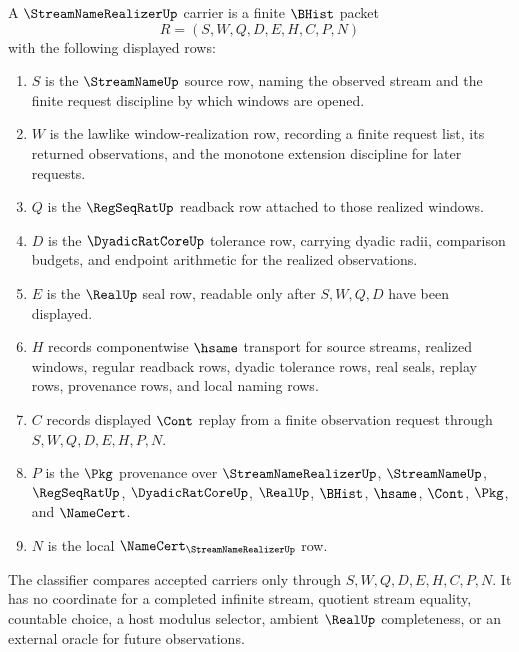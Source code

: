 \begin{definition}
\label{def:streamname-realizer-carrier}
A $\StreamNameRealizerUp$ carrier is a finite $\BHist$ packet
$$
R=(S,W,Q,D,E,H,C,P,N)
$$
with the following displayed rows:
\begin{enumerate}
\item $S$ is the $\StreamNameUp$ source row, naming the observed stream and the finite request discipline by which windows are opened.
\item $W$ is the lawlike window-realization row, recording a finite request list, its returned observations, and the monotone extension discipline for later requests.
\item $Q$ is the $\RegSeqRatUp$ readback row attached to those realized windows.
\item $D$ is the $\DyadicRatCoreUp$ tolerance row, carrying dyadic radii, comparison budgets, and endpoint arithmetic for the realized observations.
\item $E$ is the $\RealUp$ seal row, readable only after $S,W,Q,D$ have been displayed.
\item $H$ records componentwise $\hsame$ transport for source streams, realized windows, regular readback rows, dyadic tolerance rows, real seals, replay rows, provenance rows, and local naming rows.
\item $C$ records displayed $\Cont$ replay from a finite observation request through $S,W,Q,D,E,H,P,N$.
\item $P$ is the $\Pkg$ provenance over $\StreamNameRealizerUp$, $\StreamNameUp$, $\RegSeqRatUp$, $\DyadicRatCoreUp$, $\RealUp$, $\BHist$, $\hsame$, $\Cont$, $\Pkg$, and $\NameCert$.
\item $N$ is the local $\NameCert_{\StreamNameRealizerUp}$ row.
\end{enumerate}
The classifier compares accepted carriers only through $S,W,Q,D,E,H,C,P,N$. It has no coordinate for a completed infinite stream, quotient stream equality, countable choice, a host modulus selector, ambient $\RealUp$ completeness, or an external oracle for future observations.
\end{definition}

